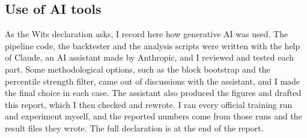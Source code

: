 \subsection{Use of AI tools}

As the Wits declaration asks, I record here how generative AI was used. The pipeline code, the backtester and the analysis scripts were written with the help of Claude, an AI assistant made by Anthropic, and I reviewed and tested each part. Some methodological options, such as the block bootstrap and the percentile strength filter, came out of discussions with the assistant, and I made the final choice in each case. The assistant also produced the figures and drafted this report, which I then checked and rewrote. I ran every official training run and experiment myself, and the reported numbers come from those runs and the result files they wrote. The full declaration is at the end of the report.
